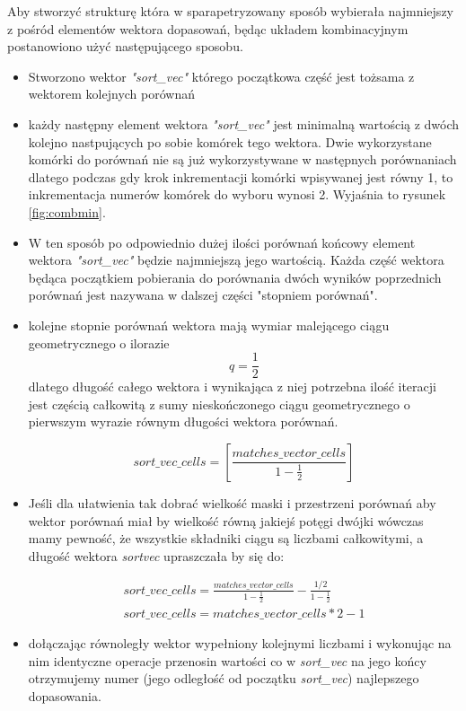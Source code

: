 Aby stworzyć strukturę która w sparapetryzowany sposób wybierała najmniejszy z
pośród elementów wektora dopasowań, będąc układem kombinacyjnym postanowiono
użyć następującego sposobu.

\begin{itemize}

\item Stworzono wektor \textit{"sort\_vec"} którego początkowa część jest tożsama
z wektorem kolejnych porównań

\item każdy następny element wektora \textit{"sort\_vec"} jest minimalną wartością
z dwóch kolejno nastpujących po sobie komórek tego wektora. Dwie wykorzystane
komórki do porównań nie są już wykorzystywane w następnych porównaniach dlatego
podczas gdy krok inkrementacji komórki wpisywanej jest równy 1, to inkrementacja
numerów komórek do wyboru wynosi 2. Wyjaśnia to rysunek \ref{fig:combmin}.

\item W ten sposób po odpowiednio dużej ilości porównań końcowy element wektora
\textit{"sort\_vec"} będzie najmniejszą jego wartością. Każda część wektora
będąca początkiem pobierania do porównania dwóch wyników poprzednich porównań
jest nazywana w dalszej części "stopniem porównań".

\item kolejne stopnie porównań wektora mają wymiar malejącego ciągu geometrycznego
 o ilorazie $$ q=\frac{1}{2} $$ dlatego długość całego wektora i wynikająca z
 niej potrzebna ilość iteracji jest częścią całkowitą z sumy nieskończonego
 ciągu geometrycznego o pierwszym wyrazie równym długości wektora porównań.

\begin{equation}
sort\_vec\_cells =  \left[ \frac{matches\_vector\_cells}{1- \frac{1}{2} }  \right]
\label{eq:sortcells1}
\end{equation}

\item Jeśli dla ułatwienia tak dobrać wielkość maski i przestrzeni porównań aby
wektor porównań miał by wielkość równą jakiejś potęgi dwójki wówczas
mamy pewność, że wszystkie składniki ciągu są liczbami całkowitymi, a
długość wektora
\textit{sortvec} upraszczała by się do:

\begin{eqnarray}
\label{eq:sortcells2}
sort\_vec\_cells = \frac{matches\_vector\_cells}{1- \frac{1}{2} } - \frac{1/2}{1-\frac{1}{2}} \\
sort\_vec\_cells = matches\_vector\_cells * 2 - 1
\end{eqnarray}

\item dołączając równoległy wektor wypełniony kolejnymi liczbami i wykonując
na nim identyczne operacje przenosin wartości co w \textit{sort\_vec} na jego
końcy otrzymujemy numer (jego odległość od początku \textit{sort\_vec}) najlepszego dopasowania.

\end{itemize}

